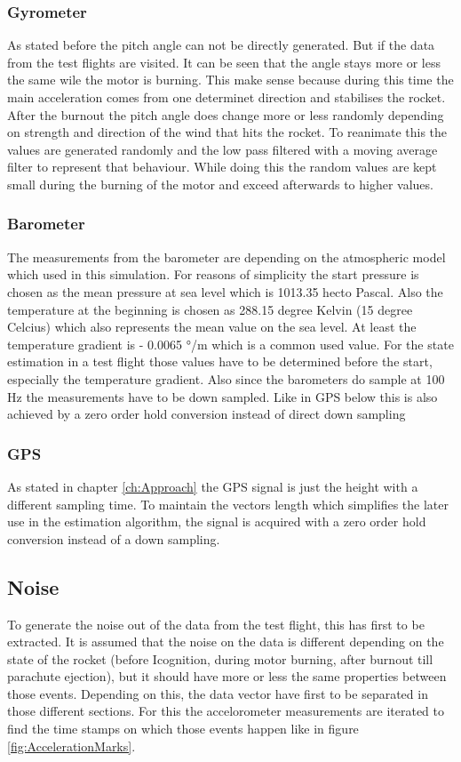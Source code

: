 \subsubsection{Gyrometer}
As stated before the pitch angle can not be directly generated.
But if the data from the test flights are visited. It can be seen that the angle stays more or less the same wile the motor is burning.
This make sense because during this time the main acceleration comes from one determinet direction and stabilises the rocket.
After the burnout the pitch angle does change more or less randomly depending on strength and direction of the wind that hits the rocket.
To reanimate this the values are generated randomly and the low pass filtered with a moving average filter to represent that behaviour.
While doing this the random values are kept small during the burning of the motor and exceed afterwards to higher values.

\subsubsection{Barometer}
The measurements from the barometer are depending on the atmospheric model which used in this simulation.
For reasons of simplicity the start pressure is chosen as the mean pressure at sea level which is 1013.35 hecto Pascal.
Also the temperature at the beginning is chosen as 288.15 degree Kelvin (15 degree Celcius) which also represents the mean value on the sea level.
At least the temperature gradient is - 0.0065 °/m which is a common used value.
For the state estimation in a test flight those values have to be determined before the start, especially the temperature gradient.
Also since the barometers do sample at 100 Hz the measurements have to be down sampled.
Like in GPS below this is also achieved by a zero order hold conversion instead of direct down sampling

\subsubsection{GPS}
As stated in chapter \ref{ch:Approach} the GPS signal is just the height with a different sampling time. 
To maintain the vectors length which simplifies the later use in the estimation algorithm,
the signal is acquired with a zero order hold conversion instead of a down sampling. 


\subsection{Noise}
To generate the noise out of the data from the test flight, this has first to be extracted.
It is assumed that the noise on the data is different depending on the state of the rocket (before Icognition, during motor burning, after burnout till parachute ejection),
but it should have more or less the same properties between those events.
Depending on this, the data vector have first to be separated in those different sections.
For this the accelorometer measurements are iterated to find the time stamps on which those events happen like in figure \ref{fig:AccelerationMarks}.


